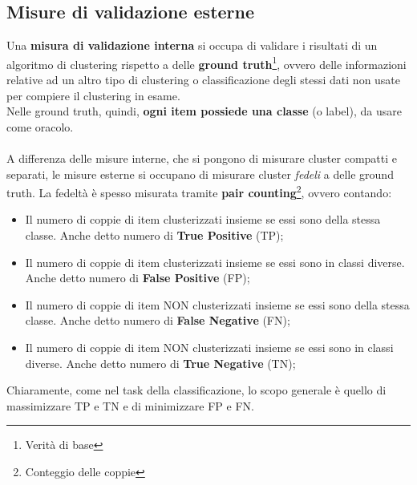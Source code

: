 \subsection{Misure di validazione esterne}
Una \textbf{misura di validazione interna} si occupa di validare i risultati di un algoritmo di clustering rispetto a delle \textbf{ground truth}\footnote{Verità di base}, ovvero delle informazioni relative ad un altro tipo di clustering o classificazione degli stessi dati non usate per compiere il clustering in esame.\\
Nelle ground truth, quindi, \textbf{ogni item possiede una classe} (o label), da usare come oracolo.\\
\\
A differenza delle misure interne, che si pongono di misurare cluster compatti e separati, le misure esterne si occupano di misurare cluster \textit{fedeli} a delle ground truth. La fedeltà è spesso misurata tramite \textbf{pair counting}\footnote{Conteggio delle coppie}, ovvero contando:
\begin{itemize}
	\item Il numero di coppie di item clusterizzati insieme se essi sono della stessa classe. Anche detto numero di \textbf{True Positive} (TP);
	\item Il numero di coppie di item clusterizzati insieme se essi sono in classi diverse. Anche detto numero di \textbf{False Positive} (FP);
	\item Il numero di coppie di item NON clusterizzati insieme se essi sono della stessa classe. Anche detto numero di \textbf{False Negative} (FN);
	\item Il numero di coppie di item NON clusterizzati insieme se essi sono in classi diverse. Anche detto numero di \textbf{True Negative} (TN);
\end{itemize}
Chiaramente, come nel task della classificazione, lo scopo generale è quello di massimizzare TP e TN e di minimizzare FP e FN.

